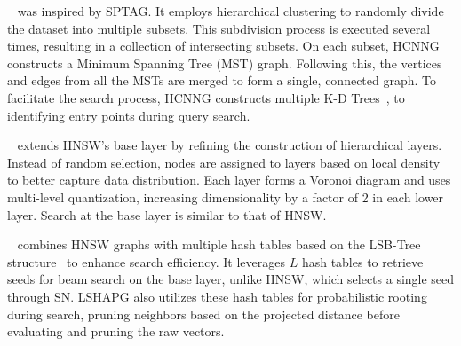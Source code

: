 ~\cite{hcnng} was inspired by SPTAG. It employs hierarchical clustering to randomly divide the dataset into multiple subsets. This subdivision process is executed several times, resulting in a collection of intersecting subsets. On each subset, HCNNG constructs a Minimum Spanning Tree (MST) graph. 
Following this, the vertices and edges from all the MSTs are merged to form a single, connected graph. 
To facilitate the search process, HCNNG constructs multiple K-D Trees~\cite{kdtree}, to identifying entry points during query search. 

~\cite{hvs} extends HNSW's base layer by refining the construction of hierarchical layers. Instead of random selection, nodes are assigned to layers based on local density to better capture data distribution. Each layer forms a Voronoi diagram %
and uses multi-level quantization, increasing dimensionality by a factor of 2 in each lower layer.
Search at the base layer is similar to that of HNSW.

~\cite{lshapg} combines HNSW graphs with multiple hash tables based on the LSB-Tree structure~\cite{lsb} to enhance search efficiency. It leverages $L$ hash tables to retrieve seeds for beam search on the base layer, unlike HNSW, which selects a single seed through SN. LSHAPG also utilizes these hash tables for probabilistic rooting during search, pruning neighbors based on the projected distance %
before evaluating and pruning the raw vectors.


